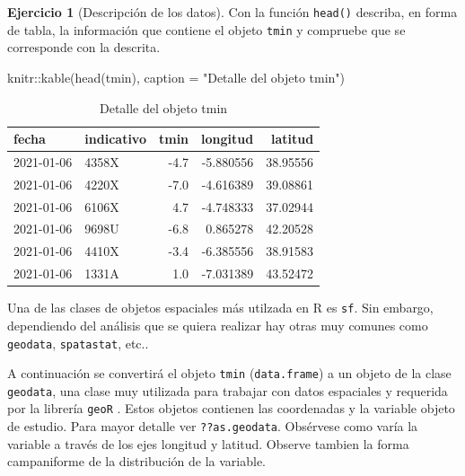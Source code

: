 \documentclass[
]{report}
\newenvironment{Shaded}{\begin{snugshade}}{\end{snugshade}}
\newcommand{\AttributeTok}[1]{\textcolor[rgb]{0.77,0.63,0.00}{#1}}
\newcommand{\FunctionTok}[1]{\textcolor[rgb]{0.00,0.00,0.00}{#1}}
\newcommand{\NormalTok}[1]{#1}
\newcommand{\SpecialCharTok}[1]{\textcolor[rgb]{0.00,0.00,0.00}{#1}}
\newcommand{\StringTok}[1]{\textcolor[rgb]{0.31,0.60,0.02}{#1}}
\theoremstyle{definition}
\theoremstyle{definition}
\theoremstyle{definition}
\newtheorem{exercise}{Ejercicio}[chapter]
\theoremstyle{definition}
\theoremstyle{remark}
\begin{document}
\begin{exercise}[Descripción de los datos]
\protect\hypertarget{exr:ex3}{}\label{exr:ex3}Con la función \texttt{head()} describa, en forma de tabla, la información que contiene
el objeto \texttt{tmin} y compruebe que se corresponde con la descrita.
\end{exercise}

\begin{Shaded}
\begin{Highlighting}[]
\NormalTok{knitr}\SpecialCharTok{::}\FunctionTok{kable}\NormalTok{(}\FunctionTok{head}\NormalTok{(tmin), }\AttributeTok{caption =} \StringTok{"Detalle del objeto tmin"}\NormalTok{)}
\end{Highlighting}
\end{Shaded}

\begin{table}

\caption{\label{tab:tmin-head}Detalle del objeto tmin}
\centering
\begin{tabular}[t]{l|l|r|r|r}
\hline
fecha & indicativo & tmin & longitud & latitud\\
\hline
2021-01-06 & 4358X & -4.7 & -5.880556 & 38.95556\\
\hline
2021-01-06 & 4220X & -7.0 & -4.616389 & 39.08861\\
\hline
2021-01-06 & 6106X & 4.7 & -4.748333 & 37.02944\\
\hline
2021-01-06 & 9698U & -6.8 & 0.865278 & 42.20528\\
\hline
2021-01-06 & 4410X & -3.4 & -6.385556 & 38.91583\\
\hline
2021-01-06 & 1331A & 1.0 & -7.031389 & 43.52472\\
\hline
\end{tabular}
\end{table}

Una de las clases de objetos espaciales más utilzada en R es \texttt{sf}. Sin embargo,
dependiendo del análisis que se quiera realizar hay otras muy comunes como
\texttt{geodata}, \texttt{spatastat}, etc..

A continuación se convertirá el objeto \texttt{tmin} (\texttt{data.frame}) a un objeto de la
clase \texttt{geodata}, una clase muy utilizada para trabajar con datos espaciales y
requerida por la librería \texttt{geoR} \citep{R-geor}. Estos objetos contienen las
coordenadas y la variable objeto de estudio. Para mayor detalle ver
\texttt{??as.geodata}. Obsérvese como varía la variable a través de los ejes longitud y
latitud. Observe tambien la forma campaniforme de la distribución de la
variable.
\end{document}
